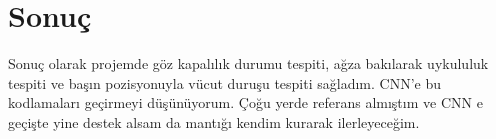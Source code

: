 \documentclass[12pt, a4paper]{article}
\begin{document}
  \section{ Sonuç} 
  Sonuç olarak projemde göz kapalılık durumu tespiti, ağza bakılarak uykululuk tespiti ve başın pozisyonuyla vücut duruşu tespiti sağladım. CNN'e bu kodlamaları geçirmeyi düşünüyorum. Çoğu yerde referans almıştım ve CNN e geçişte yine destek alsam da mantığı kendim kurarak ilerleyeceğim.
 	
 		\newpage
 	
  
\end{document}
